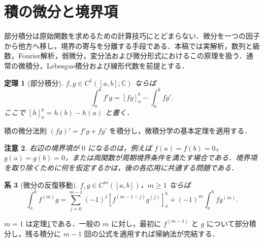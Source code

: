 \documentclass[a5paper,10pt,onecolumn]{jsarticle}
\makeatletter
\theoremstyle{mathnotetheorem}
\newtheorem{theorem}{定理}[section]
\newtheorem{corollary}[theorem]{系}
\newtheorem{remark}[theorem]{注意}
\renewcommand{\proofname}{証明}
\renewenvironment{proof}[1][\proofname]{%
  \par\pushQED{\qed}\normalfont\topsep4\p@\@plus2\p@\relax
  \trivlist\item[\hskip\labelsep\bfseries #1]\ignorespaces
}{\popQED\endtrivlist\@endpefalse}
\makeatother
\begin{document}
\section{積の微分と境界項}
部分積分は原始関数を求めるための計算技巧にとどまらない．微分を一つの因子から他方へ移し，境界の寄与を分離する手段である．本稿では実解析，数列と級数，Fourier解析，弱微分，変分法および微分形式におけるこの原理を扱う．通常の微積分，Lebesgue積分および線形代数を前提とする．
\begin{theorem}[部分積分]\label{thm:ibp}
$f,g\in C^1([a,b];\mathbb C)$ ならば
\begin{equation}\label{eq:ibp}
 \int_a^b f'g=[fg]_a^b-\int_a^b fg'.
\end{equation}
ここで $[h]_a^b=h(b)-h(a)$ と書く．
\end{theorem}
\begin{proof}
積の微分法則 $(fg)'=f'g+fg'$ を積分し，微積分学の基本定理を適用する．
\end{proof}
\begin{remark}
右辺の境界項が $0$ になるのは，例えば $f(a)=f(b)=0$，$g(a)=g(b)=0$，または両関数が周期境界条件を満たす場合である．境界項を取り除くために何を仮定するかは，後の各応用に共通する問題である．
\end{remark}
\begin{corollary}[微分の反復移動]
$f,g\in C^m([a,b])$，$m\ge1$ ならば
\[
 \int_a^b f^{(m)}g
 =\sum_{j=0}^{m-1}(-1)^j[f^{(m-1-j)}g^{(j)}]_a^b
 +(-1)^m\int_a^b fg^{(m)}.
\]
\end{corollary}
\begin{proof}
$m=1$ は定理\ref{thm:ibp}である．一般の $m$ に対し，最初に $f^{(m-1)}$ と $g$ について部分積分し，残る積分に $m-1$ 回の公式を適用すれば帰納法が完結する．
\end{proof}
\end{document}
